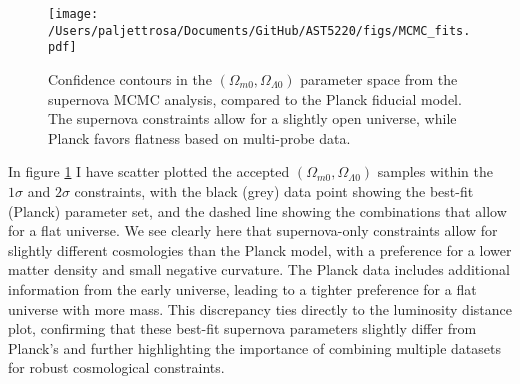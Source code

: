 \documentclass{aa}
\begin{document}
\begin{figure}
    \centering
    \texttt{[image: /Users/paljettrosa/Documents/GitHub/AST5220/figs/MCMC\_fits.pdf]}
    \caption{Confidence contours in the $(\Omega_{m0},\Omega_{\Lambda0})$ parameter space from the supernova MCMC analysis, compared to the Planck fiducial model. The supernova constraints allow for a slightly open universe, while Planck favors flatness based on multi-probe data.}\label{fig:MCMC fits}
\end{figure}

In figure \ref{fig:MCMC fits} I have scatter plotted the accepted $(\Omega_{m0},\Omega_{\Lambda0})$ samples within the $1\sigma$ and $2\sigma$ constraints, with the black (grey) data point showing the best-fit (Planck) parameter set, and the dashed line showing the combinations that allow for a flat universe. We see clearly here that supernova-only constraints allow for slightly different cosmologies than the Planck model, with a preference for a lower matter density and small negative curvature. The Planck data includes additional information from the early universe, leading to a tighter preference for a flat universe with more mass. This discrepancy ties directly to the luminosity distance plot, confirming that these best-fit supernova parameters slightly differ from Planck's and further highlighting the importance of combining multiple datasets for robust cosmological constraints.


\end{document}
